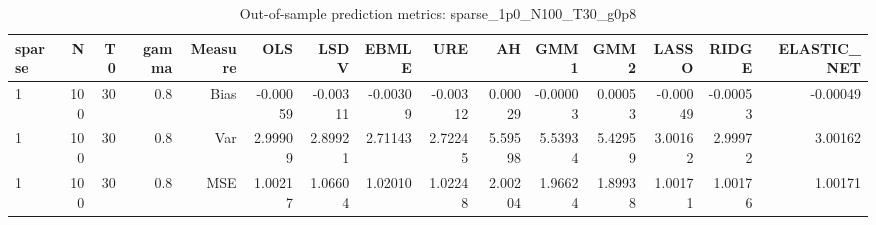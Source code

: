 \begin{table}[!htbp]\centering
\caption{Out-of-sample prediction metrics: sparse_1p0_N100_T30_g0p8}
\label{tab:table3_sparse_1p0_N100_T30_g0p8}
\begin{tabular}{lrrrrrrrrrrrrrr}
\hline
sparse & N & T0 & gamma & Measure & OLS & LSDV & EBMLE & URE & AH & GMM1 & GMM2 & LASSO & RIDGE & ELASTIC_NET \\
\hline
1 & 100 & 30 & 0.8 & Bias & -0.00059 & -0.00311 & -0.00309 & -0.00312 & 0.00029 & -0.00003 & 0.00053 & -0.00049 & -0.00053 & -0.00049 \\
1 & 100 & 30 & 0.8 & Var & 2.99909 & 2.89921 & 2.71143 & 2.72245 & 5.59598 & 5.53934 & 5.42959 & 3.00162 & 2.99972 & 3.00162 \\
1 & 100 & 30 & 0.8 & MSE & 1.00217 & 1.06604 & 1.02010 & 1.02248 & 2.00204 & 1.96624 & 1.89938 & 1.00171 & 1.00176 & 1.00171 \\
\hline
\end{tabular}
\end{table}

